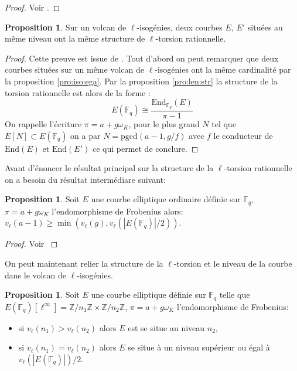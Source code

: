\documentclass[10pt,a4paper]{book}
\theoremstyle{plain}
\theoremstyle{definition}
\theoremstyle{definition}
\theoremstyle{definition}
\newtheorem{prop}[thm]{Proposition}
\theoremstyle{definition}
\theoremstyle{remark}
\theoremstyle{remark}
\theoremstyle{definition}
\begin{document}
\begin{proof}
Voir  \cite[Lemma 1]{Ruck1987}.
\end{proof}

\begin{prop}
Sur un volcan de $\ell$-isogénies, deux courbes $E$, $E'$ situées au même niveau ont la même structure de $\ell$-torsion rationnelle.
\end{prop}

\begin{proof}
Cette preuve est issue de \cite{Ionica2010}.
Tout d'abord on peut remarquer que deux courbes situées sur un même volcan de $\ell$-isogénies ont la même cardinalité par la proposition \ref{pro:iso:ega}. Par la proposition \ref{pro:len:str} la structure de la torsion rationnelle est alors de la forme :
\[
E(\mathbb{F}_{q}) \cong \frac{\mathrm{End}_{\mathbb{F}_{q}}(E)}{\pi-1}
\] 
On rappelle l'écriture $\pi=a + g \omega_K$, pour le plus grand $N$ tel que $E[N] \subset E(\mathbb{F}_q)$ on a par \cite[Lemma 1]{Ruck1987} $N=\mathrm{pgcd}(a-1,g/f)$ avec $f$ le conducteur de $\mathrm{End}(E)$ et $\mathrm{End}(E')$ ce qui permet de conclure.
\end{proof}

Avant d'énoncer le résultat principal sur la structure de la $\ell$-torsion rationnelle on a besoin du résultat intermédiare suivant:

\begin{prop}
Soit $E$ une courbe elliptique ordinaire définie sur $\mathbb{F}_q$, $\pi=a+g \omega_K$ l'endomorphisme de Frobenius alors: $v_{\ell}(a-1) \geqslant \min(v_{\ell}(g),v_{\ell}(|E(\mathbb{F}_q)|/2))$.
\end{prop}

\begin{proof}
Voir \cite[Lemma 5.2]{Ionica2010}
\end{proof}

On peut maintenant relier la structure de la $\ell$-torsion et le niveau de la courbe dans le volcan de $\ell$-isogénies.

\begin{prop}
\label{pro:niv:str}
Soit $E$ une courbe elliptique définie sur $\mathbb{F}_q$ telle que $E(\mathbb{F}_q)[\ell^{\infty}]=\mathbb{Z}/n_1\mathbb{Z} \times \mathbb{Z}/n_2\mathbb{Z}$, $\pi = a + g \omega_K$ l'endomorphisme de Frobenius:
\begin{itemize}
\item si $v_{\ell}(n_1)>v_{\ell}(n_2)$ alors $E$ est se situe au niveau $n_2$,
\item si $v_{\ell}(n_1)=v_{\ell}(n_2)$ alors $E$ se situe à un niveau supérieur ou égal à $v_{\ell}(|E(\mathbb{F}_q)|)/2$.
\end{itemize}
\end{prop}
\end{document}
